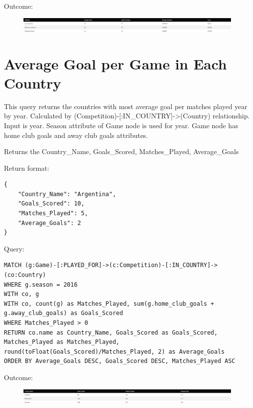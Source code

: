 \documentclass{Configuration_Files/PoliMi3i_thesis}
\begin{document}
Outcome:
\begin{figure}[H]
    \centering
    \includegraphics[width=\linewidth]{Project Template/Images/query_output/q12.png}
\end{figure}







\section{Average Goal per Game in Each Country}
This query returns the countries with most average goal per matches played year by year.
Calculated by (Competition)-[:IN\_COUNTRY]->(Country) relationship.
Input is year. Season attribute of Game node is used for year.
Game node has home club goals and away club goals attributes.

Returns the Country\_Name, Goals\_Scored, Matches\_Played, Average\_Goals

Return format:
\begin{lstlisting}[style=json]
{
    "Country_Name": "Argentina",
    "Goals_Scored": 10,
    "Matches_Played": 5,
    "Average_Goals": 2
}
\end{lstlisting}


Query:

\begin{lstlisting}[language=Cypher]
MATCH (g:Game)-[:PLAYED_FOR]->(c:Competition)-[:IN_COUNTRY]->(co:Country)
WHERE g.season = 2016
WITH co, g
WITH co, count(g) as Matches_Played, sum(g.home_club_goals + g.away_club_goals) as Goals_Scored
WHERE Matches_Played > 0
RETURN co.name as Country_Name, Goals_Scored as Goals_Scored, Matches_Played as Matches_Played, round(toFloat(Goals_Scored)/Matches_Played, 2) as Average_Goals
ORDER BY Average_Goals DESC, Goals_Scored DESC, Matches_Played ASC
\end{lstlisting}


Outcome:
\begin{figure}[H]
    \centering
    \includegraphics[width=\linewidth]{Project Template/Images/query_output/q13.png}
\end{figure}
\end{document}
